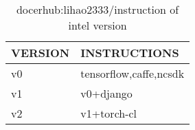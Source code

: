 \begin{table}[H]
\centering
\begin{tabular}{ll}
\toprule
  VERSION&INSTRUCTIONS\\
\midrule
  v0&tensorflow,caffe,ncsdk\\
  v1&v0+django\\
  v2&v1+torch-cl\\
\bottomrule
\end{tabular}
\caption{docerhub:lihao2333/instruction of intel version}
  \label{tbl:docker-version}
\end{table}
